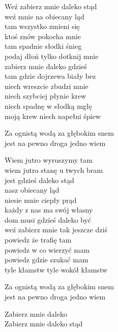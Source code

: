 \begin{text}
    Weź zabierz mnie daleko stąd\\
    weź mnie na obiecany ląd\\
    tam wszystko zmieni się\\
    ktoś znów pokocha mnie\\
    tam spadnie słodki śnieg\\
    podaj dłoń tylko dotknij mnie\\
    zabierz mnie daleko gdzieś\\
    tam gdzie dojrzewa biały bez\\
    niech wreszcie zbudzi mnie\\
    niech szybciej płynie krew\\
    niech spadnę w słodką mgłę\\
    moją krew niech napełni śpiew

    Za ognistą wodą za głębokim snem\\
    jest na pewno droga jedno wiem

    Wiem jutro wyruszymy tam\\
    wiem jutro stanę u twych bram\\
    jest gdzieś daleko stąd\\
    nasz obiecany ląd\\
    niesie mnie ciepły prąd\\
    każdy z nas ma swój własny\\
    dom musi gdzieś daleko być\\
    weź zabierz mnie tak jeszcze dziś\\
    powiedz że trafię tam\\
    powiedz w co wierzyć mam\\
    powiedz gdzie szukać mam\\
    tyle kłamstw tyle wokół kłamstw

    Za ognistą wodą za głębokim snem\\
    jest na pewno droga jedno wiem

    Zabierz mnie daleko\\
    Zabierz mnie daleko stąd
\end{text}
\begin{chord}

\end{chord}